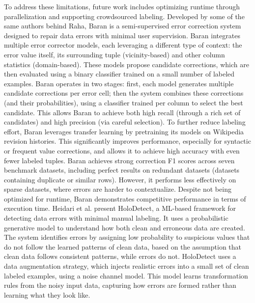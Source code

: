 To address these limitations, future work includes optimizing runtime through parallelization and supporting crowdsourced labeling.
\newline\newline
Developed by some of the same authors behind Raha, Baran \cite{BARAN} is a semi-supervised error correction system designed to repair data errors with minimal user supervision. 
Baran integrates multiple error corrector models, each leveraging a different type of context: the error value itself, its surrounding tuple (vicinity-based) and other column statistics (domain-based). 
These models propose candidate corrections, which are then evaluated using a binary classifier trained on a small number of labeled examples. 
Baran operates in two stages: first, each model generates multiple candidate corrections per error cell; then the system combines these corrections (and their probabilities), using a classifier trained per column to select the best candidate. 
This allows Baran to achieve both high recall (through a rich set of candidates) and high precision (via careful selection). 
To further reduce labeling effort, Baran leverages transfer learning by pretraining its models on Wikipedia revision histories. 
This significantly improves performance, especially for syntactic or frequent value corrections, and allows it to achieve high accuracy with even fewer labeled tuples. 
Baran achieves strong correction F1 scores across seven benchmark datasets, including perfect results on redundant datasets (datasets containing duplicate or similar rows). 
However, it performs less effectively on sparse datasets, where errors are harder to contextualize. 
Despite not being optimized for runtime, Baran demonstrates competitive performance in terms of execution time.
\newline\newline
Heidari et al. \cite{HOLODETECT} present HoloDetect, a ML-based framework for detecting data errors with minimal manual labeling. 
It uses a probabilistic generative model to understand how both clean and erroneous data are created. 
The system identifies errors by assigning low probability to suspicious values that do not follow the learned patterns of clean data, based on the assumption that clean data follows consistent patterns, while errors do not. 
HoloDetect uses a data augmentation strategy, which injects realistic errors into a small set of clean labeled examples, using a noise channel model. 
This model learns transformation rules from the noisy input data, capturing how errors are formed rather than learning what they look like.  
